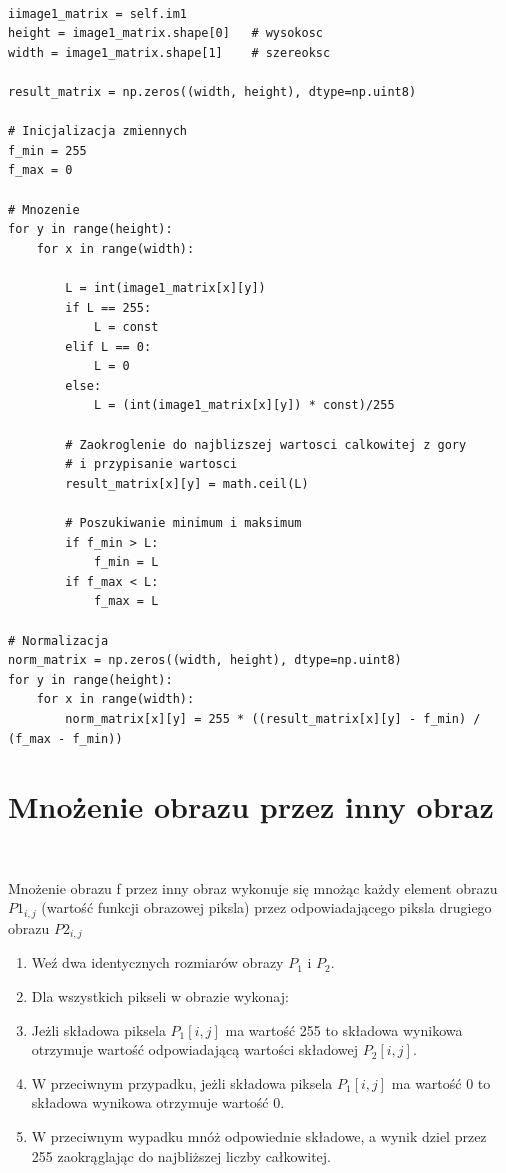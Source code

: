 \documentclass[final,a4paper,openany,12pt]{mwbk}
\begin{document}
\begin{lstlisting}[caption=Mnożenie obrazu szarego przez zadaną liczbę]

iimage1_matrix = self.im1
height = image1_matrix.shape[0]   # wysokosc
width = image1_matrix.shape[1]    # szereoksc

result_matrix = np.zeros((width, height), dtype=np.uint8)

# Inicjalizacja zmiennych
f_min = 255
f_max = 0

# Mnozenie 
for y in range(height):
    for x in range(width):  

        L = int(image1_matrix[x][y]) 
        if L == 255:
            L = const
        elif L == 0:
            L = 0
        else:
            L = (int(image1_matrix[x][y]) * const)/255 

        # Zaokroglenie do najblizszej wartosci calkowitej z gory
        # i przypisanie wartosci
        result_matrix[x][y] = math.ceil(L)

        # Poszukiwanie minimum i maksimum
        if f_min > L:
            f_min = L
        if f_max < L:
            f_max = L

# Normalizacja
norm_matrix = np.zeros((width, height), dtype=np.uint8)
for y in range(height):
    for x in range(width):
        norm_matrix[x][y] = 255 * ((result_matrix[x][y] - f_min) / (f_max - f_min))

\end{lstlisting}
\newpage

\section {Mnożenie obrazu przez inny obraz}
\hfill\\
\indent

Mnożenie obrazu f przez inny obraz wykonuje się mnożąc każdy element obrazu $P1_{i,j}$ (wartość funkcji obrazowej piksla) przez odpowiadającego piksla drugiego obrazu $P2_{i,j}$

	\begin{enumerate}
		\item Weź dwa identycznych rozmiarów obrazy $P_{1}$ i $P_{2}$.
		\item Dla wszystkich pikseli w obrazie wykonaj:
		\item Jeżli składowa piksela $P_{1}[i,j]$ ma wartość 255 to składowa wynikowa otrzymuje wartość odpowiadającą wartości składowej $P_{2}[i,j]$.
		\item W przeciwnym przypadku, jeżli składowa piksela $P_{1}[i,j]$ ma wartość 0 to składowa wynikowa otrzymuje wartość 0.
		\item W przeciwnym wypadku mnóż odpowiednie składowe, a wynik dziel przez 255 zaokrąglając do najbliższej liczby całkowitej.
	\end{enumerate}
\end{document}
